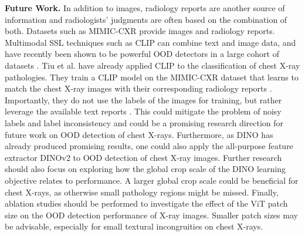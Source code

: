 \par
\textbf{Future Work.}
In addition to images, radiology reports are another source of information and radiologists' judgments are often based on the combination of both. 
Datasets such as MIMIC-CXR \citep{Johnson2019} provide images and radiology reports. 
Multimodal SSL techniques such as CLIP \citep{Radford2021} can combine text and image data, and have recently been shown to be powerful OOD detectors in a large cohort of datasets \citep{Michels2023}.
Tiu et al. \citep{Tiu2022} have already applied CLIP to the classification of chest X-ray pathologies.
They train a CLIP model on the MIMIC-CXR dataset that learns to match the chest X-ray images with their corresponding radiology reports \citep{Tiu2022}.
Importantly, they do not use the labels of the images for training, but rather leverage the available text reports \citep{Tiu2022}.
This could mitigate the problem of noisy labels and label inconsistency and could be a promising research direction for future work on OOD detection of chest X-rays.
Furthermore, as DINO has already produced promising results, one could also apply the all-purpose feature extractor DINOv2 \citep{Oquab2023} to OOD detection of chest X-ray images. 
Further research should also focus on exploring how the global crop scale of the DINO learning objective relates to performance.
A larger global crop scale could be beneficial for chest X-rays, as otherwise small pathology regions might be missed.
Finally, ablation studies should be performed to investigate the effect of the ViT patch size on the OOD detection performance of X-ray images.
Smaller patch sizes may be advisable, especially for small textural incongruities on chest X-rays.